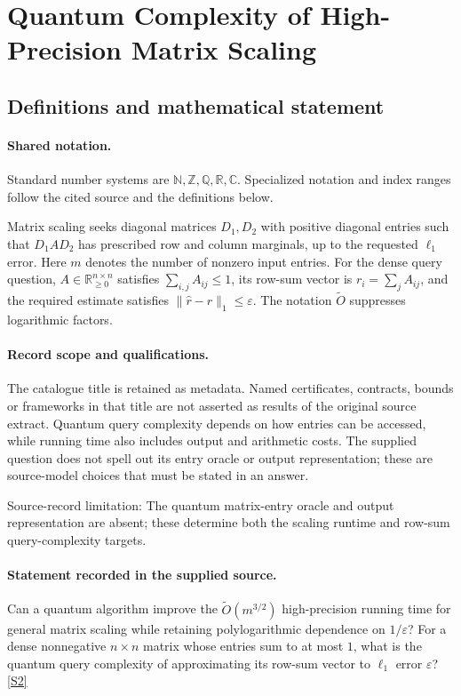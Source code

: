 \documentclass[11pt]{article}
\newcommand{\sref}[2]{\hyperlink{source:#1:#2}{[S#2]}}
\begin{document}
\section{Quantum Complexity of High-Precision Matrix Scaling}\label{statement}

\subsection{Definitions and mathematical statement}

\paragraph{Shared notation.}Standard number systems are $\mathbb N,\mathbb Z,\mathbb Q,\mathbb R,\mathbb C$. Specialized notation and index ranges follow the cited source and the definitions below.


Matrix scaling seeks diagonal matrices $D_1,D_2$ with positive diagonal entries such that $D_1AD_2$ has prescribed row and column marginals, up to the requested $\ell_1$ error. Here $m$ denotes the number of nonzero input entries. For the dense query question, $A\in\mathbb R_{\geq0}^{n\times n}$ satisfies $\sum_{i,j}A_{ij}\leq1$, its row-sum vector is $r_i=\sum_jA_{ij}$, and the required estimate satisfies $\|\widehat r-r\|_1\leq\varepsilon$. The notation $\widetilde O$ suppresses logarithmic factors.
\paragraph{Record scope and qualifications.}
The catalogue title is retained as metadata. Named certificates, contracts, bounds or frameworks in that title are not asserted as results of the original source extract.
Quantum query complexity depends on how entries can be accessed, while running time also includes output and arithmetic costs. The supplied question does not spell out its entry oracle or output representation; these are source-model choices that must be stated in an answer.

Source-record limitation: The quantum matrix-entry oracle and output representation are absent; these determine both the scaling runtime and row-sum query-complexity targets.
\paragraph{Statement recorded in the supplied source.}
Can a quantum algorithm improve the $\widetilde O(m^{3/2})$ high-precision running time for general matrix scaling while retaining polylogarithmic dependence on $1/\varepsilon$? For a dense nonnegative $n\times n$ matrix whose entries sum to at most $1$, what is the quantum query complexity of approximating its row-sum vector to $\ell_1$ error $\varepsilon$? \sref{statement}{2}
\end{document}

